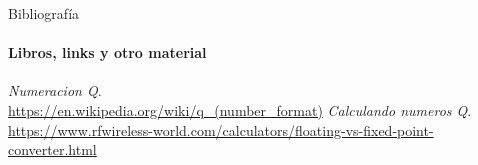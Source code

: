  \begin{frame}{Bibliografía}
    \framesubtitle{Libros, links y otro material}
    \tiny{
       \begin{thebibliography}{1}
             \emph{Numeracion Q}. \\
             \href {https://en.wikipedia.org/wiki/q_(number_format)}{https://en.wikipedia.org/wiki/q\_(number\_format)}
             \emph{Calculando numeros Q}. \\
             \href {https://www.rfwireless-world.com/calculators/floating-vs-fixed-point-converter.html}{https://www.rfwireless-world.com/calculators/floating-vs-fixed-point-converter.html}
       \end{thebibliography}
    }
 \end{frame}
\appendix
